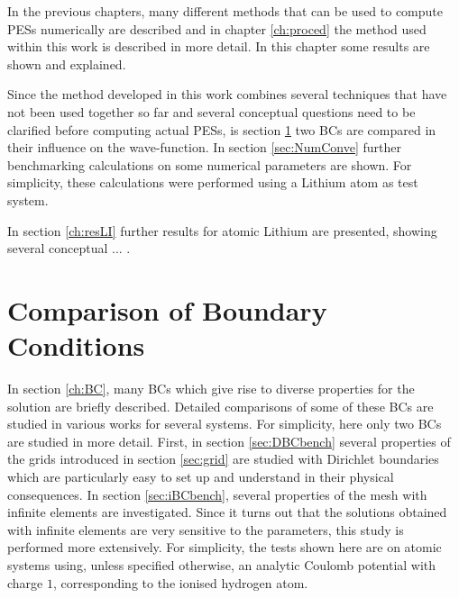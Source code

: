 \label{ch:res}
In the previous chapters, many different methods that can be used to compute PESs numerically are described and in chapter \ref{ch:proced} the method used within this work is described in more detail.
In this chapter some results are shown and explained.

Since the method developed in this work combines several techniques that have not been used together so far and several conceptual questions need to be clarified before computing actual PESs, is section \ref{ch:BCbench} two BCs are compared in their influence on the wave-function. In section \ref{sec:NumConve} further benchmarking calculations on some numerical parameters are shown.
For simplicity, these calculations were performed using a Lithium atom as test system.

In section \ref{ch:resLI} further results for atomic Lithium are presented, showing several conceptual ... .


\section{Comparison of Boundary Conditions}
\label{ch:BCbench}
In section \ref{ch:BC}, many BCs which give rise to diverse properties for the solution are briefly described.
Detailed comparisons of some of these BCs are studied in various works \cite{babuska,artBC,capComp,absRev,nrBCrev} for several systems.
For simplicity, here only two BCs are studied in more detail.
First, in section \ref{sec:DBCbench} several properties of the grids introduced in section \ref{sec:grid} are studied with Dirichlet boundaries which are particularly easy to set up and understand in their physical consequences.
In section \ref{sec:iBCbench}, several properties of the mesh with infinite elements are investigated.
Since it turns out that the solutions obtained with infinite elements are very sensitive to the parameters, this study is performed more extensively.
For simplicity, the tests shown here are on atomic systems using, unless specified otherwise, an analytic Coulomb potential with charge $1$, corresponding to the ionised hydrogen atom.

